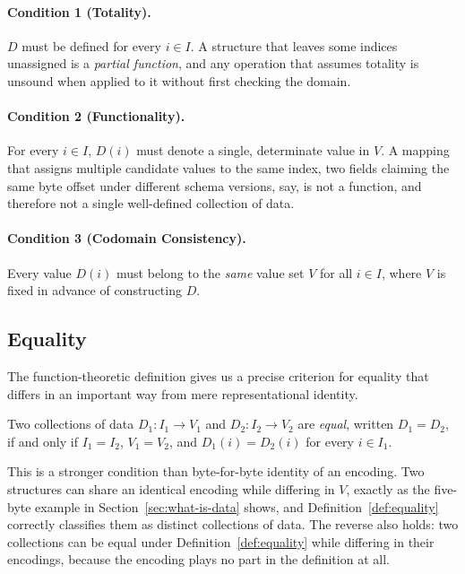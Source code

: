 \paragraph{Condition 1 (Totality).}
$D$ must be defined for every $i \in I$. A structure that leaves some indices
unassigned is a \emph{partial function}, and any operation that assumes
totality is unsound when applied to it without first checking the domain.

\paragraph{Condition 2 (Functionality).}
For every $i \in I$, $D(i)$ must denote a single, determinate value in $V$. A
mapping that assigns multiple candidate values to the same index, two fields
claiming the same byte offset under different schema versions, say, is not a
function, and therefore not a single well-defined collection of data.

\paragraph{Condition 3 (Codomain Consistency).}
Every value $D(i)$ must belong to the \emph{same} value set $V$ for all $i \in
I$, where $V$ is fixed in advance of constructing $D$.

\subsection{Equality}

The function-theoretic definition gives us a precise criterion for equality
that differs in an important way from mere representational identity.

\begin{definition}
\label{def:equality}
Two collections of data $D_1 : I_1 \to V_1$ and $D_2 : I_2 \to V_2$ are
\emph{equal}, written $D_1 = D_2$, if and only if $I_1 = I_2$, $V_1 = V_2$,
and $D_1(i) = D_2(i)$ for every $i \in I_1$.
\end{definition}

This is a stronger condition than byte-for-byte identity of an encoding. Two
structures can share an identical encoding while differing in $V$, exactly as
the five-byte example in Section~\ref{sec:what-is-data} shows, and
Definition~\ref{def:equality} correctly classifies them as distinct
collections of data. The reverse also holds: two collections can be equal
under Definition~\ref{def:equality} while differing in their encodings,
because the encoding plays no part in the definition at all.

